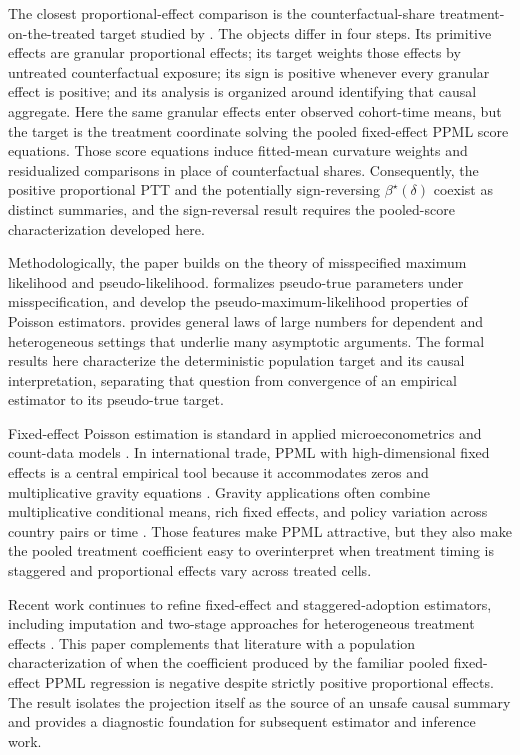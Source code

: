 The closest proportional-effect comparison is the counterfactual-share treatment-on-the-treated target studied by \citet{MoreauKastler2025PTT}. The objects differ in four steps. Its primitive effects are granular proportional effects; its target weights those effects by untreated counterfactual exposure; its sign is positive whenever every granular effect is positive; and its analysis is organized around identifying that causal aggregate. Here the same granular effects enter observed cohort-time means, but the target is the treatment coordinate solving the pooled fixed-effect PPML score equations. Those score equations induce fitted-mean curvature weights and residualized comparisons in place of counterfactual shares. Consequently, the positive proportional PTT and the potentially sign-reversing \(\beta^\star(\delta)\) coexist as distinct summaries, and the sign-reversal result requires the pooled-score characterization developed here.

Methodologically, the paper builds on the theory of misspecified maximum likelihood and pseudo-likelihood. \citet{White1982MisspecifiedML} formalizes pseudo-true parameters under misspecification, and \citet{GourierouxMonfortTrognon1984Theory,GourierouxMonfortTrognon1984Poisson} develop the pseudo-maximum-likelihood properties of Poisson estimators. \citet{Andrews1988LLN} provides general laws of large numbers for dependent and heterogeneous settings that underlie many asymptotic arguments. The formal results here characterize the deterministic population target and its causal interpretation, separating that question from convergence of an empirical estimator to its pseudo-true target.

Fixed-effect Poisson estimation is standard in applied microeconometrics and count-data models \citep{HausmanHallGriliches1984,CameronTrivedi2013}. In international trade, PPML with high-dimensional fixed effects is a central empirical tool because it accommodates zeros and multiplicative gravity equations \citep{SantosSilvaTenreyro2006,SantosSilvaTenreyro2011,CorreiaGuimaraesZylkin2020}. Gravity applications often combine multiplicative conditional means, rich fixed effects, and policy variation across country pairs or time \citep{AndersonVanWincoop2003,HeadMayer2014,YotovPiermartiniMonteiroLarch2016,NagengastYotov2025}. Those features make PPML attractive, but they also make the pooled treatment coefficient easy to overinterpret when treatment timing is staggered and proportional effects vary across treated cells.

Recent work continues to refine fixed-effect and staggered-adoption estimators, including imputation and two-stage approaches for heterogeneous treatment effects \citep{Gardner2022,Baker2025}. This paper complements that literature with a population characterization of when the coefficient produced by the familiar pooled fixed-effect PPML regression is negative despite strictly positive proportional effects. The result isolates the projection itself as the source of an unsafe causal summary and provides a diagnostic foundation for subsequent estimator and inference work.
